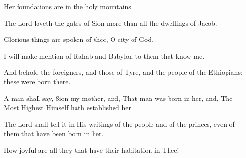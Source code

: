 Her foundations are in the holy mountains.

The Lord loveth the gates of Sion more than all the dwellings of Jacob.

Glorious things are spoken of thee, O city of God.

I will make mention of Rahab and Babylon to them that know me.

And behold the foreigners, and those of Tyre, and the people of the Ethiopians; these were born there.

A man shall say, Sion my mother, and, That man was born in her, and, The Most Highest Himself hath established her.

The Lord shall tell it in His writings of the people and of the princes, even of them that have been born in her.

How joyful are all they that have their habitation in Thee!
